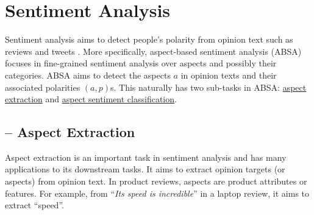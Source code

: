 \section{Sentiment Analysis}
\label{chap6:sec:sa}

Sentiment analysis aims to detect people's polarity from opinion text such as reviews and tweets \cite{Liu2012}.
More specifically, aspect-based sentiment analysis (ABSA) focuses in fine-grained sentiment analysis over aspects and possibly their categories.
ABSA aims to detect the aspects $a$ in opinion texts and their associated polarities $(a, p)$s.
This naturally has two sub-tasks in ABSA: \underline{aspect extraction} and \underline{aspect sentiment classification}.

\subsection{-- Aspect Extraction}


Aspect extraction is an important task in sentiment analysis \cite{HuL2004} and has many applications to its downstream tasks\cite{Liu2012}.
It aims to extract opinion targets (or aspects) from opinion text. 
In product reviews, aspects are product attributes or features. 
For example, from ``\textit{Its speed is incredible}'' in a laptop review, it aims to extract ``speed''. 

